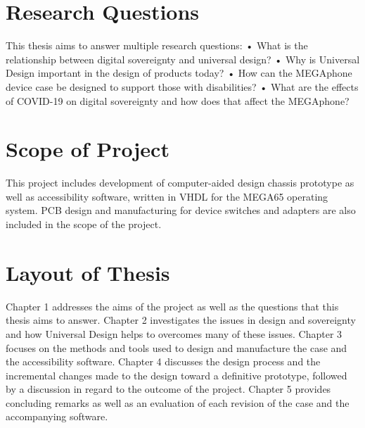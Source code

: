 
\section{Research Questions}

This thesis aims to answer multiple research questions:
    • What is the relationship between digital sovereignty and universal design?
    • Why is Universal Design important in the design of products today?
    • How can the MEGAphone device case be designed to support those with disabilities?
    • What are the effects of COVID-19 on digital sovereignty and how does that affect the MEGAphone?


\section{Scope of Project}

This project includes development of computer-aided design chassis prototype as well as accessibility software, written in VHDL for the MEGA65 operating system. 
PCB design and manufacturing for device switches and adapters are also included in the scope of the project.


\section{Layout of Thesis}

Chapter 1 addresses the aims of the project as well as the questions that this thesis aims to answer. 
Chapter 2 investigates the issues in design and sovereignty and how Universal Design helps to overcomes many of these issues. 
Chapter 3 focuses on the methods and tools used to design and manufacture the case and the accessibility software. 
Chapter 4 discusses the design process and the incremental changes made to the design toward a definitive prototype, followed by a discussion in regard to the outcome of the project. 
Chapter 5 provides concluding remarks as well as an evaluation of each revision of the case and the accompanying software.